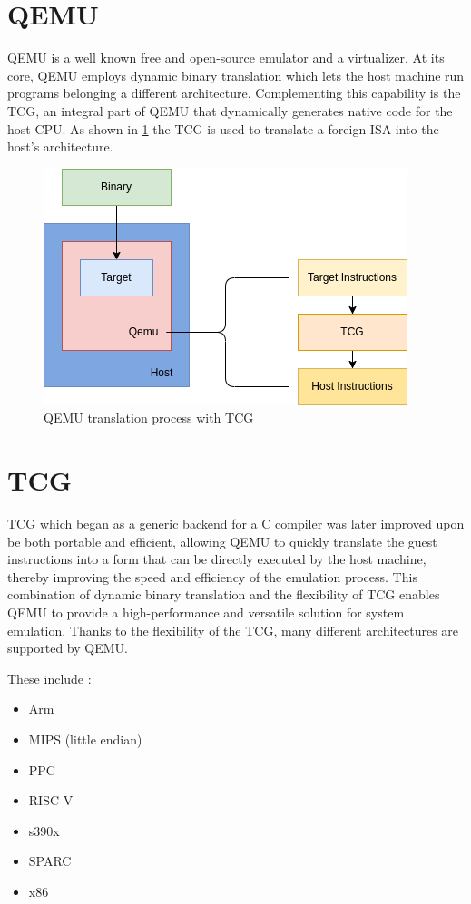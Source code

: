 \section{QEMU}
\ac{QEMU} is a well known free and open-source emulator and a virtualizer. 
At its core, \ac{QEMU} employs dynamic binary translation which lets the host machine run programs belonging a different architecture.
Complementing this capability is the \ac{TCG}, an integral part of \ac{QEMU} that dynamically generates native code for the host CPU.
As shown in \ref{fig:qemu_tcg} the \ac{TCG} is used to translate a foreign ISA into the host's architecture.

\begin{figure}[ht]
    \centering
    \includegraphics[width=0.8\linewidth]{figures/Qemu_TCG}
    \caption{\ac{QEMU} translation process with \ac{TCG}}
    \label{fig:qemu_tcg}
\end{figure}

\section{TCG}
\ac{TCG} \cite{qemu_tcg} which began as a generic backend for a C compiler was later improved upon be both portable and efficient, allowing \ac{QEMU} to quickly translate the guest instructions into a form that can be directly executed by the host machine, thereby improving the speed and efficiency of the emulation process.
This combination of dynamic binary translation and the flexibility of \ac{TCG} enables \ac{QEMU} to provide a high-performance and versatile solution for system emulation.
Thanks to the flexibility of the \ac{TCG}, many different architectures are supported by \ac{QEMU}.

These include \cite{qemu_arch}:
\begin{itemize}
    \item Arm
    \item MIPS (little endian)
	\item PPC
	\item RISC-V
	\item s390x
	\item SPARC
	\item x86
\end{itemize}

